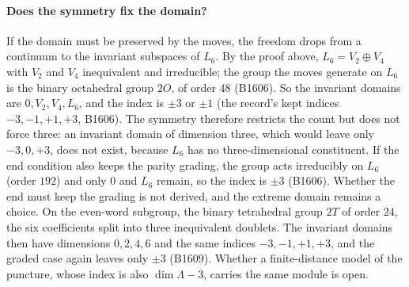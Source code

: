 \paragraph{Does the symmetry fix the domain?}
If the domain must be preserved by the moves, the freedom drops from a continuum to the invariant subspaces of $L_6$. By
the proof above, $L_6=V_2\oplus V_4$ with $V_2$ and $V_4$ inequivalent and irreducible; the group the moves generate on
$L_6$ is the binary octahedral group $2O$, of order $48$ (B1606). So the invariant domains are $0,V_2,V_4,L_6$, and the
index is $\pm3$ or $\pm1$ (the record's kept indices $-3,-1,+1,+3$, B1606). The symmetry therefore
restricts the count but does not force three: an invariant domain of dimension three, which would leave only $-3,0,+3$,
does not exist, because $L_6$ has no three-dimensional constituent. If the end condition also keeps the parity grading, the group acts irreducibly on $L_6$ (order $192$) and only $0$ and $L_6$ remain, so the index is $\pm3$ (B1606). Whether the end must keep the grading is not derived, and the extreme domain remains a choice. On the even-word subgroup, the binary tetrahedral group $2T$ of order $24$, the six coefficients split into three inequivalent doublets. The invariant domains then have dimensions $0,2,4,6$ and the same indices $-3,-1,+1,+3$, and the graded case again leaves only $\pm3$ (B1609). Whether a
finite-distance model of the puncture, whose index is also $\dim\Lambda-3$, carries the same module is open.

